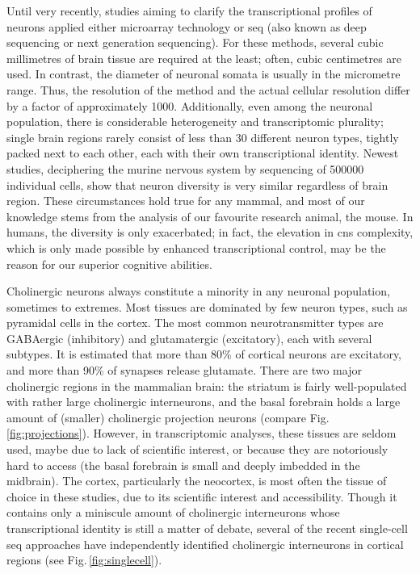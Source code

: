 Until very recently, studies aiming to clarify the transcriptional profiles of neurons applied either microarray technology or \ac{seq} (also known as deep sequencing or next generation sequencing). For these methods, several cubic millimetres of brain tissue are required at the least; often, cubic centimetres are used. In contrast, the diameter of neuronal somata is usually in the micrometre range. Thus, the resolution of the method and the actual cellular resolution differ by a factor of approximately \num{1000}. Additionally, even among the neuronal population, there is considerable heterogeneity and transcriptomic plurality; single brain regions rarely consist of less than 30 different neuron types, tightly packed next to each other, each with their own transcriptional identity.\cite{Darmanis2015, Zeisel2015, Tasic2016, Habib2016} Newest studies, deciphering the murine nervous system by sequencing of \num{500000} individual cells, show that neuron diversity is very similar regardless of brain region.\cite{Zeisel2018} These circumstances hold true for any mammal, and most of our knowledge stems from the analysis of our favourite research animal, the mouse. In humans, the diversity is only exacerbated; in fact, the elevation in \ac{cns} complexity, which is only made possible by enhanced transcriptional control, may be the reason for our superior cognitive abilities.\cite{}

Cholinergic neurons always constitute a minority in any neuronal population, sometimes to extremes. Most tissues are dominated by few neuron types, such as pyramidal cells in the cortex. The most common neurotransmitter types are GABAergic (inhibitory) and glutamatergic (excitatory), each with several subtypes. It is estimated that more than 80\% of cortical neurons are excitatory, and more than 90\% of synapses release glutamate.\cite{Raichle2002} There are two major cholinergic regions in the mammalian brain: the striatum is fairly well-populated with rather large cholinergic interneurons, and the basal forebrain holds a large amount of (smaller) cholinergic projection neurons (compare Fig.\,\ref{fig:projections}). However, in transcriptomic analyses, these tissues are seldom used, maybe due to lack of scientific interest, or because they are notoriously hard to access (the basal forebrain is small and deeply imbedded in the midbrain). The cortex, particularly the neocortex, is most often the tissue of choice in these studies, due to its scientific interest and accessibility. Though it contains only a miniscule amount of cholinergic interneurons whose transcriptional identity is still a matter of debate, several of the recent single-cell \ac{seq} approaches have independently identified cholinergic interneurons in cortical regions (see Fig.\,\ref{fig:singlecell}).


